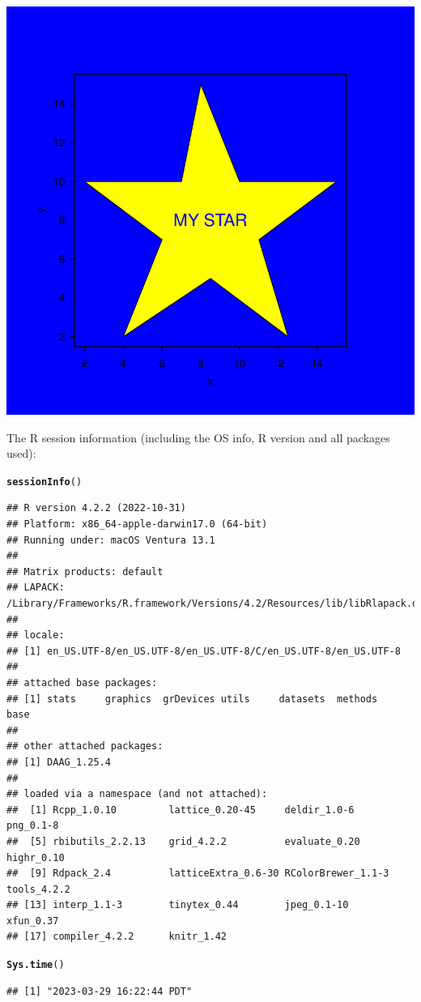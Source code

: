 \documentclass{article}\usepackage[]{graphicx}\usepackage[]{xcolor}
\makeatletter
\newcommand{\hlstd}[1]{\textcolor[rgb]{0.345,0.345,0.345}{#1}}%
\newcommand{\hlkwd}[1]{\textcolor[rgb]{0.737,0.353,0.396}{\textbf{#1}}}%
\newenvironment{kframe}{%
 \def\at@end@of@kframe{}%
 \ifinner\ifhmode%
  \def\at@end@of@kframe{\end{minipage}}%
  \begin{minipage}{\columnwidth}%
 \fi\fi%
 \def\FrameCommand##1{\hskip\@totalleftmargin \hskip-\fboxsep
 \colorbox{shadecolor}{##1}\hskip-\fboxsep
     \hskip-\linewidth \hskip-\@totalleftmargin \hskip\columnwidth}%
 \MakeFramed {\advance\hsize-\width
   \@totalleftmargin\z@ \linewidth\hsize
   \@setminipage}}%
 {\par\unskip\endMakeFramed%
 \at@end@of@kframe}
\newenvironment{knitrout}{}{} %
\makeatother
\begin{document}
\begin{knitrout}
{\centering \includegraphics[width=.6\linewidth]{figure/Meng51940633A4-Rnwauto-report-9} 

}


\end{knitrout}

The R session information (including the OS info, R version and all
packages used):

\begin{knitrout}
\color{fgcolor}\begin{kframe}
\begin{alltt}
\hlkwd{sessionInfo}\hlstd{()}
\end{alltt}
\begin{verbatim}
## R version 4.2.2 (2022-10-31)
## Platform: x86_64-apple-darwin17.0 (64-bit)
## Running under: macOS Ventura 13.1
## 
## Matrix products: default
## LAPACK: /Library/Frameworks/R.framework/Versions/4.2/Resources/lib/libRlapack.dylib
## 
## locale:
## [1] en_US.UTF-8/en_US.UTF-8/en_US.UTF-8/C/en_US.UTF-8/en_US.UTF-8
## 
## attached base packages:
## [1] stats     graphics  grDevices utils     datasets  methods   base     
## 
## other attached packages:
## [1] DAAG_1.25.4
## 
## loaded via a namespace (and not attached):
##  [1] Rcpp_1.0.10         lattice_0.20-45     deldir_1.0-6        png_0.1-8          
##  [5] rbibutils_2.2.13    grid_4.2.2          evaluate_0.20       highr_0.10         
##  [9] Rdpack_2.4          latticeExtra_0.6-30 RColorBrewer_1.1-3  tools_4.2.2        
## [13] interp_1.1-3        tinytex_0.44        jpeg_0.1-10         xfun_0.37          
## [17] compiler_4.2.2      knitr_1.42
\end{verbatim}
\begin{alltt}
\hlkwd{Sys.time}\hlstd{()}
\end{alltt}
\begin{verbatim}
## [1] "2023-03-29 16:22:44 PDT"
\end{verbatim}
\end{kframe}
\end{knitrout}
\end{document}
